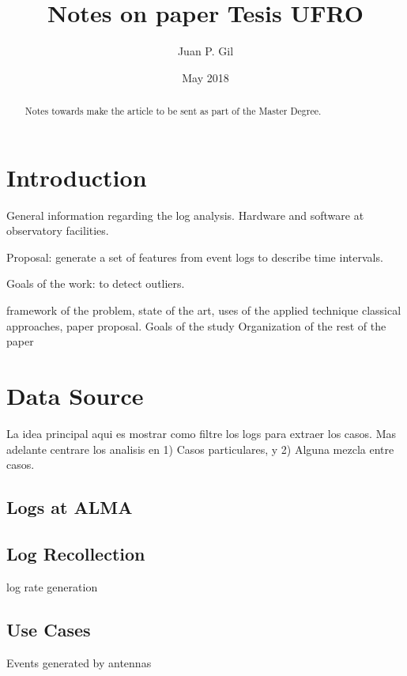 \documentclass{article}
\title{Notes on paper Tesis UFRO}
\author{Juan P. Gil }
\date{May 2018}
\begin{document}
\maketitle

\begin{abstract}
Notes towards make the article to be sent as part of the Master Degree.
\end{abstract}




\section{Introduction}

General information regarding the log analysis.
Hardware and software at observatory facilities.


Proposal: generate a set of features from event logs to describe time intervals.

Goals of the work: to detect outliers.

framework of the problem, state of the art, uses of the applied technique
classical approaches, paper proposal. Goals of the study
Organization of the rest of the paper


\section{Data Source}

La idea principal aqui es mostrar como filtre los logs para extraer los casos. Mas adelante centrare los analisis en 1) Casos particulares, y 2) Alguna mezcla entre casos.

\subsection{Logs at ALMA}

\subsection{Log Recollection}

log rate generation


\subsection{Use Cases}
Events generated by antennas
\end{document}

